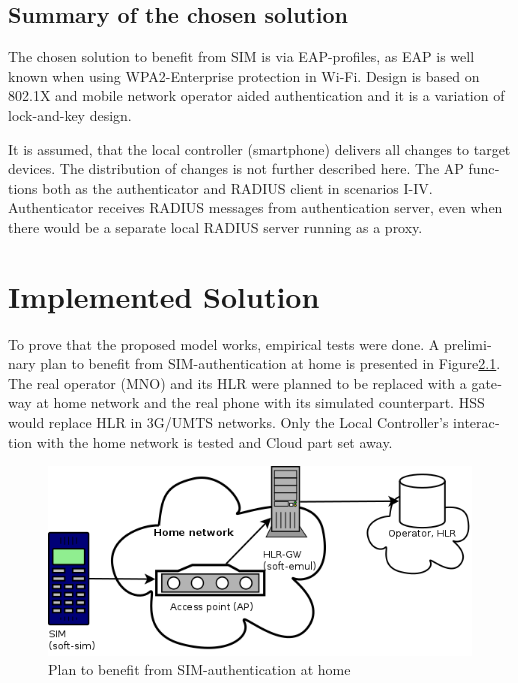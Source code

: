 \documentclass[12pt,a4paper,english]{tutthesis}
\begin{document}
\begin{otherlanguage}{english}
\section{Summary of the chosen solution}
\label{sec-4-7}


The chosen solution to benefit from SIM is via EAP-profiles, as EAP
is well known when using WPA2-Enterprise protection in Wi-Fi.
Design is based on 802.1X and mobile network operator aided
authentication and it is a variation of lock-and-key design.

It is assumed, that  the local controller (smartphone)
delivers all changes to target devices.
The distribution of changes \cite{silverajan2015collaborative} is not
further described here.  The AP functions both as the authenticator
and RADIUS client in scenarios I-IV.  Authenticator receives RADIUS
messages from authentication server, even when there would be a
separate local RADIUS server running as a proxy.



\chapter{Implemented Solution}
\label{sec-5}


To prove that the proposed model works, empirical tests were done.
A preliminary plan to benefit from SIM-authentication at home is
presented in Figure\ref{fig:sim-pre}. The real operator (MNO) and its HLR were 
planned to be replaced with a gateway at home network and the real phone
with its simulated counterpart. HSS would replace HLR in 3G/UMTS
networks. 
Only the Local Controller's interaction with the home network is
tested and Cloud part set away.

\begin{figure}[htb]
\centering
\includegraphics[width=.9\linewidth]{phone-soft-hlr.png}
\caption{\label{fig:sim-pre}Plan to benefit from SIM-authentication at home}
\end{figure}


\end{otherlanguage}
\end{document}
